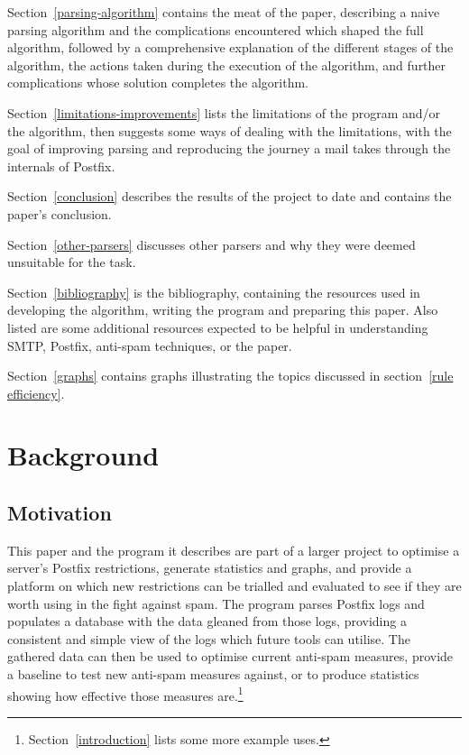 \documentclass[a4paper,12pt,draft]{article}
\begin{document}
Section~\ref{parsing-algorithm} contains the meat of the paper, describing
a naive parsing algorithm and the complications encountered which shaped
the full algorithm, followed by a comprehensive explanation of the
different stages of the algorithm, the actions taken during the execution
of the algorithm, and further complications whose solution completes the
algorithm.

Section~\ref{limitations-improvements} lists the limitations of the program
and/or the algorithm, then suggests some ways of dealing with the
limitations, with the goal of improving parsing and reproducing the journey
a mail takes through the internals of Postfix.

Section~\ref{conclusion} describes the results of the project to date and
contains the paper's conclusion.

Section~\ref{other-parsers} discusses other parsers and why they were
deemed unsuitable for the task.

Section~\ref{bibliography} is the bibliography, containing the resources
used in developing the algorithm, writing the program and preparing this
paper.  Also listed are some additional resources expected to be helpful in
understanding SMTP, Postfix, anti-spam techniques, or the paper.

Section~\ref{graphs} contains graphs illustrating the topics discussed in
section~\ref{rule efficiency}.

\section{Background}

\label{background}

\subsection{Motivation}

This paper and the program it describes are part of a larger project to
optimise a server's Postfix restrictions, generate statistics and graphs,
and provide a platform on which new restrictions can be trialled and
evaluated to see if they are worth using in the fight against spam.  The
program parses Postfix logs and populates a database with the data gleaned
from those logs, providing a consistent and simple view of the logs which
future tools can utilise.  The gathered data can then be used to optimise
current anti-spam measures, provide a baseline to test new anti-spam
measures against, or to produce statistics showing how effective those
measures are.\footnote{Section~\ref{introduction} lists some more example
uses.}
\end{document}
